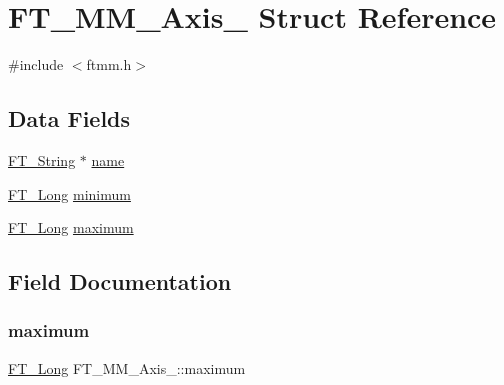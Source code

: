 \hypertarget{struct_f_t___m_m___axis__}{}\section{F\+T\+\_\+\+M\+M\+\_\+\+Axis\+\_\+ Struct Reference}
\label{struct_f_t___m_m___axis__}


{\ttfamily \#include $<$ftmm.\+h$>$}

\subsection*{Data Fields}
\begin{DoxyCompactItemize}
\item 
\hyperlink{fttypes_8h_a9846214585359eb2ba6bbb0e6de30639}{F\+T\+\_\+\+String} $\ast$ \hyperlink{struct_f_t___m_m___axis___a5c784efa44906c0e2b715eb1f866a09f}{name}
\item 
\hyperlink{fttypes_8h_a7fa72a1f0e79fb1860c5965789024d6f}{F\+T\+\_\+\+Long} \hyperlink{struct_f_t___m_m___axis___a9dc31f02b350b1356e0896673b5b73a4}{minimum}
\item 
\hyperlink{fttypes_8h_a7fa72a1f0e79fb1860c5965789024d6f}{F\+T\+\_\+\+Long} \hyperlink{struct_f_t___m_m___axis___addac1f8e71da1bedea9b393ae2751881}{maximum}
\end{DoxyCompactItemize}


\subsection{Field Documentation}
\mbox{\label{struct_f_t___m_m___axis___addac1f8e71da1bedea9b393ae2751881}} 
\subsubsection{\texorpdfstring{maximum}{maximum}}
{\footnotesize\ttfamily \hyperlink{fttypes_8h_a7fa72a1f0e79fb1860c5965789024d6f}{F\+T\+\_\+\+Long} F\+T\+\_\+\+M\+M\+\_\+\+Axis\+\_\+\+::maximum}

\mbox{\label{struct_f_t___m_m___axis___a9dc31f02b350b1356e0896673b5b73a4}} 
